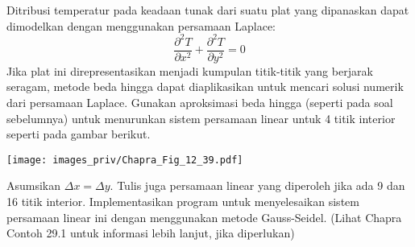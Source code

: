 \begin{soal}
Ditribusi temperatur pada keadaan tunak dari suatu plat yang dipanaskan
dapat dimodelkan dengan menggunakan persamaan Laplace:
\begin{equation*}
\frac{\partial^2 T}{\partial x^2} + \frac{\partial^2 T}{\partial y^2} = 0
\end{equation*}
Jika plat ini direpresentasikan menjadi kumpulan titik-titik yang berjarak
seragam, metode beda hingga dapat diaplikasikan untuk mencari solusi numerik
dari persamaan Laplace. Gunakan aproksimasi beda hingga (seperti pada soal
sebelumnya) untuk menurunkan sistem persamaan linear untuk 4 titik interior
seperti pada gambar berikut.

{\centering
\texttt{[image: images\_priv/Chapra\_Fig\_12\_39.pdf]}
\par}

Asumsikan $\Delta x = \Delta y$. Tulis juga persamaan linear yang diperoleh
jika ada 9 dan 16 titik interior.
Implementasikan program untuk menyelesaikan sistem persamaan linear
ini dengan menggunakan metode Gauss-Seidel.
(Lihat Chapra Contoh 29.1 untuk informasi lebih lanjut, jika diperlukan)
\end{soal}

